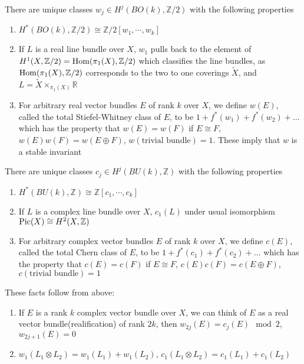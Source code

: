 \documentclass[main]{subfiles}
\begin{document}
\begin{theorem}
There are unique classes $w_j\in H^j(BO(k),\mathbb Z/2)$ with the following properties
\begin{enumerate}
\item $H^*(BO(k),\mathbb Z/2)\cong \mathbb Z/2[w_1,\cdots,w_k]$
\item If $L$ is a real line bundle over $X$, $w_1$ pulls back to the element of $H^1(X,\mathbb Z/2)=\operatorname{Hom}(\pi_1(X),\mathbb Z/2)$ which classifies the line bundles, as $\operatorname{Hom}(\pi_1(X),\mathbb Z/2)$ corresponds to the two to one coverings $\tilde X$, and $L=\tilde X\times_{\pi_1(X)}\mathbb R$
\item For arbitrary real vector bundles $E$ of rank $k$ over $X$, we define $w(E)$, called the total Stiefel-Whitney class of $E$, to be $1+f^*(w_1)+f^*(w_2)+\dots$ which has the property that $w(E)=w(F)$ if $E\cong F$, $w(E)w(F)=w(E\oplus F)$, $w(\text{trivial bundle})=1$. These imply that $w$ is a stable invariant
\end{enumerate}
There are unique classes $c_j\in H^j(BU(k),\mathbb Z)$ with the following properties
\begin{enumerate}
\item $H^*(BU(k),\mathbb Z)\cong \mathbb Z[c_1,\cdots,c_k]$
\item If $L$ is a complex line bundle over $X$, $c_1(L)$ under usual isomorphism $\operatorname{Pic}(X)\cong H^2(X,\mathbb Z)$
\item For arbitrary complex vector bundles $E$ of rank $k$ over $X$, we define $c(E)$, called the total Chern class of $E$, to be $1+f^*(c_1)+f^*(c_2)+\dots$ which has the property that $c(E)=c(F)$ if $E\cong F$, $c(E)c(F)=c(E\oplus F)$, $c(\text{trivial bundle})=1$
\end{enumerate}
\end{theorem}

\begin{note}
These facts follow from above:
\begin{enumerate}
\item  If $E$ is a rank $k$ complex vector bundle over $X$, we can think of $E$ as a real vector bundle(realification) of rank $2k$, then $w_{2j}(E)=c_j(E)\mod2$, $w_{2j+1}(E)=0$
\item $w_1(L_1\otimes L_2)=w_1(L_1)+w_1(L_2)$, $c_1(L_1\otimes L_2)=c_1(L_1)+c_1(L_2)$
\end{enumerate}
\end{note}
\end{document}
